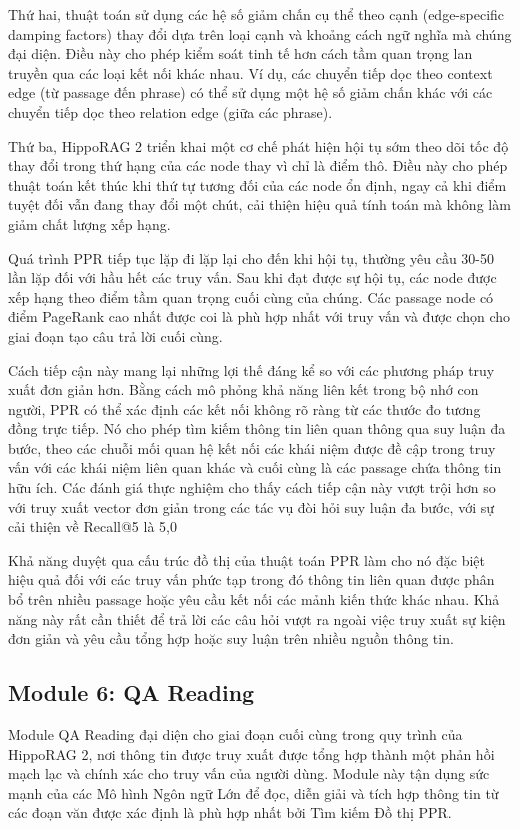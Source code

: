 \documentclass[../main.tex]{subfiles}
\begin{document}
Thứ hai, thuật toán sử dụng các hệ số giảm chấn cụ thể theo cạnh (edge-specific damping factors) thay đổi dựa trên loại cạnh và khoảng cách ngữ nghĩa mà chúng đại diện. Điều này cho phép kiểm soát tinh tế hơn cách tầm quan trọng lan truyền qua các loại kết nối khác nhau. Ví dụ, các chuyển tiếp dọc theo context edge (từ passage đến phrase) có thể sử dụng một hệ số giảm chấn khác với các chuyển tiếp dọc theo relation edge (giữa các phrase).

Thứ ba, HippoRAG 2 triển khai một cơ chế phát hiện hội tụ sớm theo dõi tốc độ thay đổi trong thứ hạng của các node thay vì chỉ là điểm thô. Điều này cho phép thuật toán kết thúc khi thứ tự tương đối của các node ổn định, ngay cả khi điểm tuyệt đối vẫn đang thay đổi một chút, cải thiện hiệu quả tính toán mà không làm giảm chất lượng xếp hạng.

Quá trình PPR tiếp tục lặp đi lặp lại cho đến khi hội tụ, thường yêu cầu 30-50 lần lặp đối với hầu hết các truy vấn. Sau khi đạt được sự hội tụ, các node được xếp hạng theo điểm tầm quan trọng cuối cùng của chúng. Các passage node có điểm PageRank cao nhất được coi là phù hợp nhất với truy vấn và được chọn cho giai đoạn tạo câu trả lời cuối cùng.

Cách tiếp cận này mang lại những lợi thế đáng kể so với các phương pháp truy xuất đơn giản hơn. Bằng cách mô phỏng khả năng liên kết trong bộ nhớ con người, PPR có thể xác định các kết nối không rõ ràng từ các thước đo tương đồng trực tiếp. Nó cho phép tìm kiếm thông tin liên quan thông qua suy luận đa bước, theo các chuỗi mối quan hệ kết nối các khái niệm được đề cập trong truy vấn với các khái niệm liên quan khác và cuối cùng là các passage chứa thông tin hữu ích. Các đánh giá thực nghiệm cho thấy cách tiếp cận này vượt trội hơn so với truy xuất vector đơn giản trong các tác vụ đòi hỏi suy luận đa bước, với sự cải thiện về Recall@5 là 5,0%

Khả năng duyệt qua cấu trúc đồ thị của thuật toán PPR làm cho nó đặc biệt hiệu quả đối với các truy vấn phức tạp trong đó thông tin liên quan được phân bổ trên nhiều passage hoặc yêu cầu kết nối các mảnh kiến thức khác nhau. Khả năng này rất cần thiết để trả lời các câu hỏi vượt ra ngoài việc truy xuất sự kiện đơn giản và yêu cầu tổng hợp hoặc suy luận trên nhiều nguồn thông tin.

\subsection{Module 6: QA Reading}
Module QA Reading đại diện cho giai đoạn cuối cùng trong quy trình của HippoRAG 2, nơi thông tin được truy xuất được tổng hợp thành một phản hồi mạch lạc và chính xác cho truy vấn của người dùng. Module này tận dụng sức mạnh của các Mô hình Ngôn ngữ Lớn để đọc, diễn giải và tích hợp thông tin từ các đoạn văn được xác định là phù hợp nhất bởi Tìm kiếm Đồ thị PPR.
\end{document}

